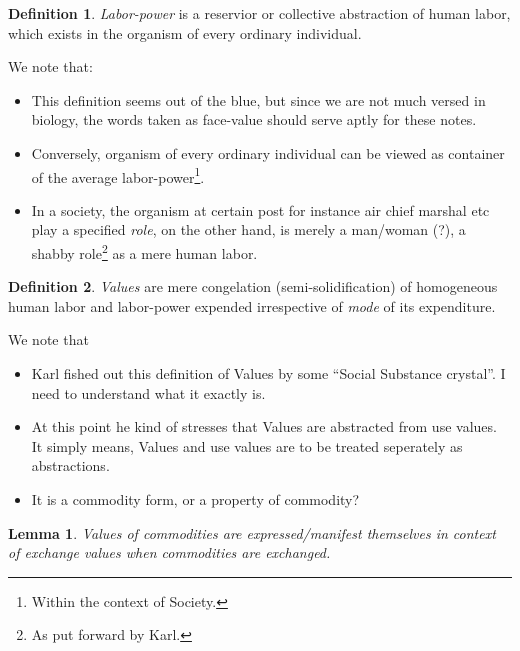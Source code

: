 \documentclass[12pt]{extarticle}
\newtheorem{lemma}[theorem]{Lemma}
\theoremstyle{definition}
\newtheorem{definition}{Definition}[section]
\newenvironment{remark}[1][Remark]{\begin{trivlist}
\item[\hskip \labelsep {\bfseries #1}]}{\end{trivlist}}
\begin{document}
      \begin{definition}
        \label{def:labpow}
        \emph{Labor-power} is a reservior or collective abstraction of human labor, which exists in the organism of every ordinary individual.
      \end{definition}
      \begin{remark}
        We note that:
        \begin{itemize}
        \item This definition seems out of the blue, but since we are not much versed in biology, the words taken as face-value should serve aptly for these notes.
        \item Conversely, organism of every ordinary individual can be viewed as container of the average labor-power\footnote{Within the context of Society.}.
          \item In a society, the organism at certain post for instance air chief marshal etc play a specified \emph{role}, on the other hand, is merely a man/woman (?), a shabby role\footnote{As put forward by Karl.} as a mere human labor.
        \end{itemize}
      \end{remark}
      
      \begin{definition}
        \label{def:values}
        \emph{Values} are mere congelation (semi-solidification) of homogeneous human labor and labor-power expended irrespective of \emph{mode} of its expenditure.
      \end{definition}

      \begin{remark}
        \label{rem:values}
        We note that
        \begin{itemize}
        \item Karl fished out this definition of Values by some ``Social Substance crystal''.  I need to understand what it exactly is.
        \item At this point he kind of stresses that Values are abstracted from use values.  It simply means, Values and use values are to be treated seperately as abstractions.
          \item It is a commodity form, or a property of commodity?
        \end{itemize}
      \end{remark}

      \begin{lemma}
        \label{lemma:valinexval}
        Values of commodities are expressed/manifest themselves in context of exchange values when commodities are exchanged.
      \end{lemma}
\end{document}
